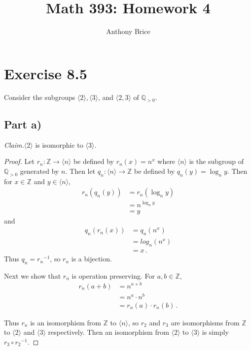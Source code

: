 \documentclass{abrice}
\title{Math 393: Homework 4}
\author{Anthony Brice}
\newcommand{\Z}{\mathbb{Z}}
\newcommand{\Q}{\mathbb{Q}}
\newcommand{\Claim}{\noindent\emph{Claim.}\xspace}%
\begin{document}
\maketitle

\section{Exercise 8.5}

Consider the subgroups $\langle 2 \rangle, \langle 3 \rangle$, and $\langle 2,3
\rangle$ of $\Q_{>0}$.

\subsection{Part a)}

\Claim $\langle 2 \rangle$ is isomorphic to $\langle 3 \rangle$.

\begin{proof}
  Let $r_n : \Z \to \langle n \rangle$ be defined by $r_n(x) = n^x$ where
  $\langle n \rangle$ is the subgroup of $\Q_{>0}$ generated by $n$. Then let
  $q_n : \langle n \rangle \to \Z$ be defined by $q_n(y) = \log_n y$. Then for
  $x \in \Z$ and $y \in \langle n \rangle$,
  \begin{align*}
    r_n(q_n(y))
    &= r_n(\log_n y) \\
    &= n^{\log_n y} \\
    &= y
  \end{align*}
  and
  \begin{align*}
    q_n(r_n(x))
    &= q_n(n^x) \\
    &= log_n (n^x) \\
    &= x\, .
  \end{align*}
  Thus $q_n = {r_n}^{-1}$, so $r_n$ is a bijection.

  Next we show that $r_n$ is operation preserving. For $a,b \in \Z$,
  \begin{align*}
    r_n(a + b)
    &= n^{a + b} \\
    &= n^a \cdot n^b \\
    &= r_n(a) \cdot r_n(b)\, .
  \end{align*}

  Thus $r_n$ is an isomorphism from $\Z$ to $\langle n \rangle$, so $r_2$ and
  $r_3$ are isomorphisms from $\Z$ to $\langle 2 \rangle$ and $\langle 3
  \rangle$ respectively. Then an isomorphism from $\langle 2 \rangle$ to
  $\langle 3 \rangle$ is simply $r_3 \circ {r_2}^{-1}$.
\end{proof}
\end{document}
